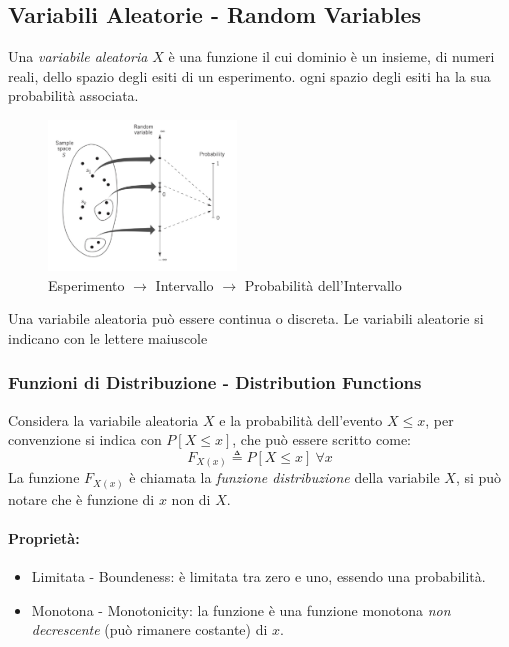     \subsection{Variabili Aleatorie - Random Variables}
        Una \emph{variabile aleatoria} $X$ è una funzione il cui dominio è un insieme, di numeri reali, dello spazio degli esiti di un esperimento. ogni spazio degli esiti
        ha la sua probabilità associata. 
        \begin{figure}[H]
            \centering
            \includegraphics[width = 5cm]{media/insieme variabili aleatorie.png}
            \caption{Esperimento $\rightarrow$ Intervallo $\rightarrow$ Probabilità dell'Intervallo}
        \end{figure}
        Una variabile aleatoria può essere continua o discreta. Le variabili aleatorie si indicano con le lettere
        maiuscole
        \subsubsection{Funzioni di Distribuzione - Distribution Functions}
            Considera la variabile aleatoria $X$ e la probabilità dell'evento $X\leq x$, per convenzione si indica con $P[X\leq x]$,
            che può essere scritto come:
            \[
                F_{X(x)} \triangleq P[X\leq x]\ \forall x    
            \]
            La funzione $F_{X(x)}$ è chiamata la \emph{funzione distribuzione} della variabile $X$, si può notare che è funzione di $x$ non di 
            $X$.
            \paragraph{Proprietà:}
                \begin{itemize}
                    \item {Limitata - Boundeness: è limitata tra zero e uno, essendo una probabilità.}
                    \item {Monotona - Monotonicity: la funzione è una funzione monotona \emph{non decrescente} (può rimanere costante) di $x$.}
                \end{itemize}
